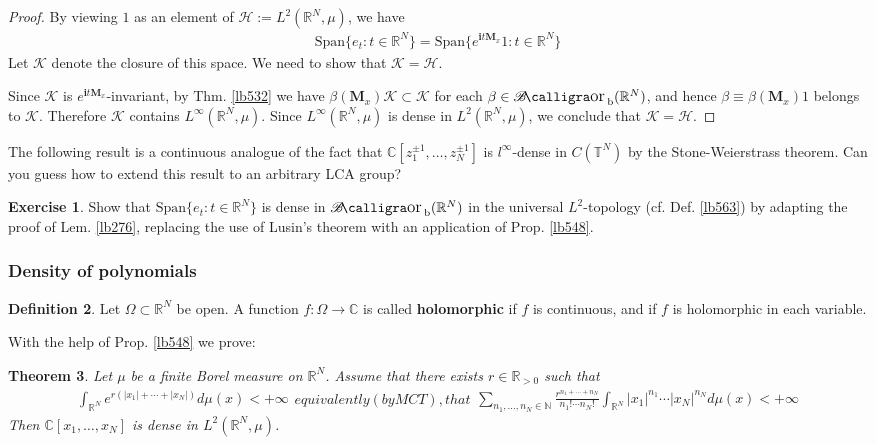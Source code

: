 \documentclass[12pt,b5paper,notitlepage]{article}
\theoremstyle{definition}
\newtheorem{df}{Definition}[subsection]
\newtheorem{exe}[df]{Exercise}
\theoremstyle{plain}
\newtheorem{thm}[df]{Theorem}
\DeclareMathOperator{\Borb}{{\mathscr{B}\text{\kern -2pt {\calligra\large or}}\,}_{\mathrm b}}
\newcommand{\Span}{\mathrm{Span}}
\newcommand{\im}{\mathbf{i}}
\newcommand{\Cbb}{\mathbb C}
\newcommand{\Nbb}{\mathbb N}
\newcommand{\Rbb}{\mathbb R}
\newcommand{\Tbb}{\mathbb T}
\newcommand{\MH}{\mathcal H}
\newcommand{\MK}{\mathcal K}
\newcommand{\Mbf}{\mathbf M}
\numberwithin{equation}{section}
\begin{document}
\begin{proof}
By viewing $1$ as an element of $\MH:=L^2(\Rbb^N,\mu)$, we have
\begin{align*}
\Span\{e_t:t\in\Rbb^N\}=\Span\{e^{\im t\Mbf_x}1:t\in\Rbb^N\}
\end{align*}
Let $\MK$ denote the closure of this space. We need to show that $\MK=\MH$.


Since $\MK$ is $e^{\im t\Mbf_x}$-invariant, by Thm. \ref{lb532} we have $\beta(\Mbf_x)\MK\subset\MK$ for each $\beta\in\Borb(\Rbb^N)$, and hence $\beta\equiv\beta(\Mbf_x)1$ belongs to $\MK$. Therefore $\MK$ contains $L^\infty(\Rbb^N,\mu)$. Since $L^\infty(\Rbb^N,\mu)$ is dense in $L^2(\Rbb^N,\mu)$, we conclude that $\MK=\MH$.
\end{proof}


The following result is a continuous analogue of the fact that $\Cbb[z_1^{\pm1},\dots,z_N^{\pm1}]$ is $l^\infty$-dense in $C(\Tbb^N)$ by the Stone-Weierstrass theorem. Can you guess how to extend this result to an arbitrary LCA group?

\begin{exe}
Show that $\Span\{e_t:t\in\Rbb^N\}$ is dense in $\Borb(\Rbb^N)$ in the universal $L^2$-topology (cf. Def. \ref{lb563}) by adapting the proof of Lem. \ref{lb276}, replacing the use of Lusin's theorem with an application of Prop. \ref{lb548}.
\end{exe}



\subsubsection{Density of polynomials}


\begin{df}
Let $\Omega\subset\Rbb^N$ be open. A function $f:\Omega\rightarrow\Cbb$ is called \textbf{holomorphic}  if $f$ is continuous, and if $f$ is holomorphic in each variable.
\end{df}


With the help of Prop. \ref{lb548} we prove:


\begin{thm}\label{lb547}
Let $\mu$ be a finite Borel measure on $\Rbb^N$. Assume that there exists $r\in\Rbb_{>0}$ such that
\begin{subequations}\label{eq267}
\begin{align}\label{eq264}
\int_{\Rbb^N} e^{r(|x_1|+\cdots+|x_N|)}d\mu(x)<+\infty
\end{align}
equivalently (by MCT), that
\begin{align}\label{eq266}
\sum_{n_1,\dots,n_N\in\Nbb}\frac{r^{n_1+\cdots+n_N}}{n_1!\cdots n_N!}\int_{\Rbb^N}|x_1|^{n_1}\cdots|x_N|^{n_N}d\mu(x)<+\infty
\end{align}
\end{subequations}
Then $\Cbb[x_1,\dots,x_N]$ is dense in $L^2(\Rbb^N,\mu)$.
\end{thm}
\end{document}
